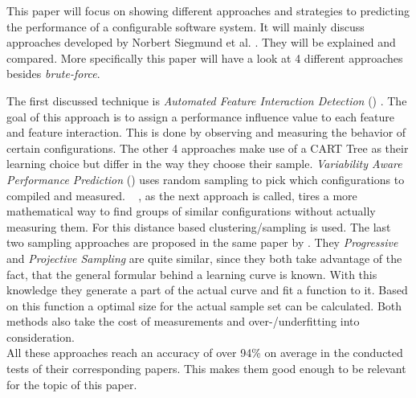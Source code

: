 \newpage\noindent
This paper will focus on showing different approaches and strategies to predicting the performance of a configurable software system. It will mainly discuss approaches developed by Norbert Siegmund et al. \cite{AutomatedFeatureDetectionSiegmund2012,VariabilityAwarePerformancePredictionJianmeiSigmundApel,CostEfficientSampling_Gou_Siegmund_2015, DistanceBasedSampling2019}. They will be explained and compared. More specifically this paper will have a look at 4 different approaches besides \textit{brute-force}.

The first discussed technique is \textit{Automated Feature Interaction Detection} (\AFID) \cite{AutomatedFeatureDetectionSiegmund2012}. The goal of this approach is to assign a performance influence value to each feature and feature interaction. This is done by observing and measuring the behavior of certain configurations. 
The other 4 approaches make use of a CART Tree as their learning choice but differ in the way they choose their sample. 
\textit{Variability Aware Performance Prediction} (\VAPP) \cite{VariabilityAwarePerformancePredictionJianmeiSigmundApel} uses random sampling to pick which configurations to compiled and measured. 
\WHAT~ \cite{DistanceBasedSampling2019}, as the next approach is called, tires a more mathematical way to find groups of similar configurations without actually measuring them. For this distance based clustering/sampling is used. 
The last two sampling approaches are proposed in the same paper by \citet{CostEfficientSampling_Gou_Siegmund_2015}. They \textit{Progressive} and \textit{Projective Sampling} are quite similar, since they both take advantage of the fact, that the general formular behind a learning curve is known. With this knowledge they generate a part of the actual curve and fit a function to it. Based on this function a optimal size for the actual sample set can be calculated. Both methods also take the cost of measurements and over-/underfitting into consideration.\\
All these approaches reach an accuracy of over 94\% on average in the conducted tests of their corresponding papers. This makes them good enough to be relevant for the topic of this paper.
